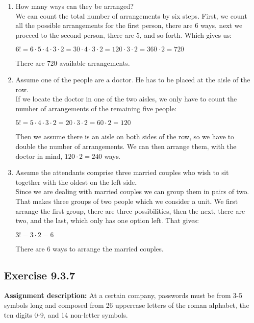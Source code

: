 \documentclass{report}
\newcommand{\cent}[1]{\begin{center}#1\end{center}}
\newcommand{\AssignmentDescription}{\textbf{Assignment description: }}
\newcommand{\Exercise}[1]{\subsection{Exercise #1}}
\newcommand{\defaultEnumerateLabel}{\textbf{\alph*.}}
\newcommand{\MyItem}[1]{\item #1\\}
\newcommand{\LetterEnumeration}[1]{\begin{enumerate}[label = \defaultEnumerateLabel]
		#1
\end{enumerate}}
\begin{document}
 	\LetterEnumeration{
 		\MyItem{How many ways can they be arranged?}
 		We can count the total number of arrangements by six steps. First, we count all the possible arrangements for the first person, there are 6 ways, next we proceed to the second person, there are 5, and so forth. Which gives us:
 		
 		\cent{$6! = 6 \cdot 5 \cdot 4 \cdot 3 \cdot 2  = 30 \cdot 4 \cdot 3 \cdot 2  = 120 \cdot 3 \cdot 2 = 360 \cdot 2 = 720$}
 		
 		There are 720 available arrangements.\\
 		
 		\MyItem{Assume one of the people are a doctor. He has to be placed at the aisle of the row.}
 		
 		If we locate the doctor in one of the two aisles, we only have to count the number of arrangements of the remaining five people:
 		
 		\cent{$5! = 5 \cdot 4 \cdot 3 \cdot 2 = 20 \cdot 3 \cdot 2 = 60 \cdot 2 = 120$}
 		
 		Then we assume there is an aisle on both sides of the row, so we have to double the number of arrangements. We can then arrange them, with the doctor in mind,  $120 \cdot 2 = 240$ ways.
 		
 		\MyItem{Assume the attendants comprise three married couples who wish to sit together with the oldest on the left side.}
 		
 		Since we are dealing with married couples we can group them in pairs of two. That makes three groups of two people which we consider a unit. We first arrange the first group, there are three possibilities, then the next, there are two, and the last, which only has one option left. That gives:
 		
 		\cent{$3! = 3 \cdot  2 = 6$}
 		
 		There are 6 ways to arrange the married couples.\\		
 	}
 	
 	\Exercise{9.3.7}
 	\AssignmentDescription
 	At a certain company, passwords must be from 3-5 symbols long and composed from 26 uppercase letters of the roman alphabet, the ten digits 0-9, and 14 non-letter symbols.\\
 	
\end{document}

